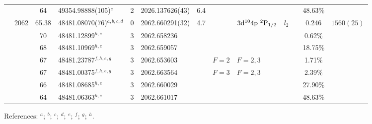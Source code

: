 \begin{table*}
\begin{center}
{\begin{tabular}{:l;l;c;l;c;l;c;l;l;c;c;c;c}
\rowstyle{\itshape}               &        & 64        & 49354.98888(105)$^{e}$           & 2 &   2026.137626(43)  &  6.4 & $                                        $ & $                                        $ & $      $ &              & 48.63\%   & $          $\\
                                  & 2062   & 65.38     & 48481.08070(76)$^{a,b,c,d}$      & 0 &   2062.660291(32)  &  4.7 & $                                        $ & $3\rm{d}^{10}4\rm{p}~^2\rm{P}_{1/2}      $ & $l_{2} $ &              & 0.246     & $ 1560(25) $\\
\rowstyle{\itshape}               &        & 70        & 48481.12899$^{h,e}$              & 3 &   2062.658236      &      & $                                        $ & $                                        $ & $      $ &              & 0.62\%    & $          $\\
\rowstyle{\itshape}               &        & 68        & 48481.10969$^{h,e}$              & 3 &   2062.659057      &      & $                                        $ & $                                        $ & $      $ &              & 18.75\%   & $          $\\
\rowstyle{\itshape}               &        & 67        & 48481.23787$^{f,h,e,g}$          & 3 &   2062.653603      &      & $F=2                                     $ & $F=2,3                                   $ & $      $ &              & 1.71\%    & $          $\\
\rowstyle{\itshape}               &        & 67        & 48481.00375$^{f,h,e,g}$          & 3 &   2062.663564      &      & $F=3                                     $ & $F=2,3                                   $ & $      $ &              & 2.39\%    & $          $\\
\rowstyle{\itshape}               &        & 66        & 48481.08685$^{h,e}$              & 3 &   2062.660029      &      & $                                        $ & $                                        $ & $      $ &              & 27.90\%   & $          $\\
\rowstyle{\itshape}               &        & 64        & 48481.06363$^{h,e}$              & 3 &   2062.661017      &      & $                                        $ & $                                        $ & $      $ &              & 48.63\%   & $          $\\
\hline
\end{tabular}
}
{\footnotesize References:
$^{a}$\citet{Aldenius:2009:014008};
$^{b}$\citet{Pickering:2000:163};
$^{c}$\citet{Ruffoni:2010:424};
$^{d}$\citet{Nave:2012:1570};
$^{e}$\citet{Matsubara:2003:209};
$^{f}$\citet{Campbell:1997:2351};
$^{g}$\citet{Dixit:2008:025001};
$^{h}$\citet{Berengut:2003:022502}.}
\end{center}
\end{table*}
